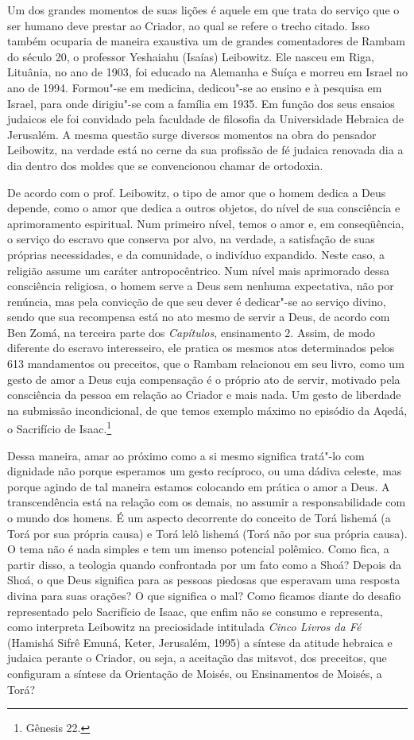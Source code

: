 Um dos grandes momentos de suas lições é aquele em que trata do serviço
que o ser humano deve prestar ao Criador, ao qual se refere o trecho
citado. Isso também ocuparia de maneira exaustiva um de grandes
comentadores de Rambam do século 20, o professor Yeshaiahu (Isaías)
Leibowitz. Ele nasceu em Riga, Lituânia, no ano de 1903, foi educado na
Alemanha e Suíça e morreu em Israel no ano de 1994. Formou"-se em
medicina, dedicou"-se ao ensino e à pesquisa em Israel, para onde
dirigiu"-se com a família em 1935. Em função dos seus ensaios judaicos
ele foi convidado pela faculdade de filosofia da Universidade Hebraica
de Jerusalém. A mesma questão surge diversos momentos na obra do
pensador Leibowitz, na verdade está no cerne da sua profissão de fé
judaica renovada dia a dia dentro dos moldes que se convencionou chamar
de ortodoxia.

De acordo com o prof. Leibowitz, o tipo de amor que o homem dedica a
Deus depende, como o amor que dedica a outros objetos, do nível de sua
consciência e aprimoramento espiritual. Num primeiro nível, temos o amor
e, em conseqüência, o serviço do escravo que conserva por alvo, na
verdade, a satisfação de suas próprias necessidades, e da comunidade, o
indivíduo expandido. Neste caso, a religião assume um caráter
antropocêntrico. Num nível mais aprimorado dessa consciência religiosa,
o homem serve a Deus sem nenhuma expectativa, não por renúncia, mas pela
convicção de que seu dever é dedicar"-se ao serviço divino, sendo que sua
recompensa está no ato mesmo de servir a Deus, de acordo com Ben Zomá,
na terceira parte dos \emph{Capítulos}, ensinamento 2. Assim, de modo
diferente do escravo interesseiro, ele pratica os mesmos atos
determinados pelos 613 mandamentos ou preceitos, que o Rambam relacionou
em seu livro, como um gesto de amor a Deus cuja compensação é o próprio
ato de servir, motivado pela consciência da pessoa em relação ao Criador
e mais nada. Um gesto de liberdade na submissão incondicional, de que
temos exemplo máximo no episódio da Aqedá, o Sacrifício de Isaac.\footnote{Gênesis 22.}

Dessa maneira, amar ao próximo como a si mesmo significa tratá"-lo com
dignidade não porque esperamos um gesto recíproco, ou uma dádiva
celeste, mas porque agindo de tal maneira estamos colocando em prática o
amor a Deus. A transcendência está na relação com os demais, no assumir
a responsabilidade com o mundo dos homens. É um aspecto decorrente do
conceito de Torá lishemá (a Torá por sua própria causa) e Torá lelô
lishemá (Torá não por sua própria causa). O tema não é nada simples e
tem um imenso potencial polêmico. Como fica, a partir disso, a teologia
quando confrontada por um fato como a Shoá? Depois da Shoá, o que Deus
significa para as pessoas piedosas que esperavam uma resposta divina
para suas orações? O que significa o mal? Como ficamos diante do desafio
representado pelo Sacrifício de Isaac, que enfim não se consumo e
representa, como interpreta Leibowitz na preciosidade intitulada
\emph{Cinco Livros da Fé} (Hamishá Sifrê Emuná, Keter, Jerusalém, 1995)
a síntese da atitude hebraica e judaica perante o Criador, ou seja, a
aceitação das mitsvot, dos preceitos, que configuram a síntese da
Orientação de Moisés, ou Ensinamentos de Moisés, a Torá?

